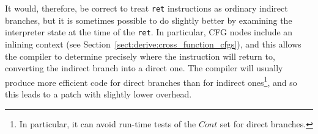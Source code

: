 It would, therefore, be correct to treat \texttt{ret} instructions as
ordinary indirect branches, but it is sometimes possible to do
slightly better by examining the interpreter state at the time of the
\texttt{ret}.  In particular, CFG nodes include an inlining context
(see Section~\ref{sect:derive:cross_function_cfgs}), and this allows
the compiler to determine precisely where the instruction will return
to, converting the indirect branch into a direct one.  The compiler
will usually produce more efficient code for direct branches than for
indirect ones\footnote{In particular, it can avoid run-time tests of
  the $\mathit{Cont}$ set for direct branches.}, and so this leads to
a patch with slightly lower overhead.



